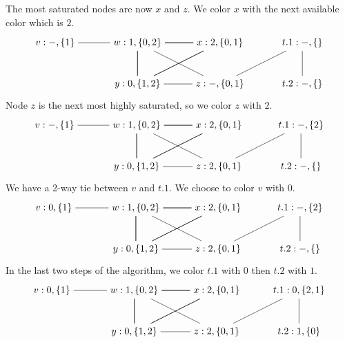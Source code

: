\documentclass[11pt]{book}
\begin{document}
The most saturated nodes are now $x$ and $z$. We color $x$ with the
next available color which is $2$.
\[
\begin{tikzpicture}[baseline=(current  bounding  box.center)]
\node (v) at (0,0)    {$v:-,\{1\}$};
\node (w) at (3,0)    {$w:1,\{0,2\}$};
\node (x) at (6,0)    {$x:2,\{0,1\}$};
\node (y) at (3,-1.5) {$y:0,\{1,2\}$};
\node (z) at (6,-1.5) {$z:-,\{0,1\}$};
\node (t1) at (9,0)   {$t.1:-,\{\}$};
\node (t2) at (9,-1.5) {$t.2:-,\{\}$};
\draw (t1) to (z);
\draw (t2) to (t1);
\draw (v) to (w);
\foreach \i in {w,x,y} 
{
  \foreach \j in {w,x,y}
  { 
    \draw (\i) to (\j);
  }
}
\draw (z) to (w);
\draw (z) to (y);
\end{tikzpicture}
\]
Node $z$ is the next most highly saturated, so we color $z$ with $2$.
\[
\begin{tikzpicture}[baseline=(current  bounding  box.center)]
\node (v) at (0,0)   {$v:-,\{1\}$};
\node (w) at (3,0)   {$w:1,\{0,2\}$};
\node (x) at (6,0)   {$x:2,\{0,1\}$};
\node (y) at (3,-1.5)  {$y:0,\{1,2\}$};
\node (z) at (6,-1.5)  {$z:2,\{0,1\}$};
\node (t1) at (9,0)   {$t.1:-,\{2\}$};
\node (t2) at (9,-1.5) {$t.2:-,\{\}$};
\draw (t1) to (z);
\draw (t2) to (t1);
\draw (v) to (w);
\foreach \i in {w,x,y} 
{
  \foreach \j in {w,x,y}
  { 
    \draw (\i) to (\j);
  }
}
\draw (z) to (w);
\draw (z) to (y);
\end{tikzpicture}
\]
We have a 2-way tie between $v$ and $t.1$. We choose to color $v$ with
$0$.
\[
\begin{tikzpicture}[baseline=(current  bounding  box.center)]
\node (v) at (0,0)   {$v:0,\{1\}$};
\node (w) at (3,0)   {$w:1,\{0,2\}$};
\node (x) at (6,0)   {$x:2,\{0,1\}$};
\node (y) at (3,-1.5)  {$y:0,\{1,2\}$};
\node (z) at (6,-1.5)  {$z:2,\{0,1\}$};
\node (t1) at (9,0)   {$t.1:-,\{2\}$};
\node (t2) at (9,-1.5) {$t.2:-,\{\}$};
\draw (t1) to (z);
\draw (t2) to (t1);
\draw (v) to (w);
\foreach \i in {w,x,y} 
{
  \foreach \j in {w,x,y}
  { 
    \draw (\i) to (\j);
  }
}
\draw (z) to (w);
\draw (z) to (y);
\end{tikzpicture}
\]
In the last two steps of the algorithm, we color $t.1$ with $0$
then $t.2$ with $1$.
\[
\begin{tikzpicture}[baseline=(current  bounding  box.center)]
\node (v) at (0,0)   {$v:0,\{1\}$};
\node (w) at (3,0)   {$w:1,\{0,2\}$};
\node (x) at (6,0)   {$x:2,\{0,1\}$};
\node (y) at (3,-1.5)  {$y:0,\{1,2\}$};
\node (z) at (6,-1.5)  {$z:2,\{0,1\}$};
\node (t1) at (9,0)   {$t.1:0,\{2,1\}$};
\node (t2) at (9,-1.5) {$t.2:1,\{0\}$};
\draw (t1) to (z);
\draw (t2) to (t1);
\draw (v) to (w);
\foreach \i in {w,x,y} 
{
  \foreach \j in {w,x,y}
  { 
    \draw (\i) to (\j);
  }
}
\draw (z) to (w);
\draw (z) to (y);
\end{tikzpicture}
\]
\end{document}
